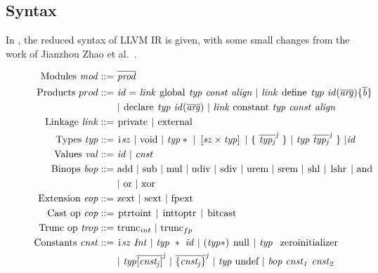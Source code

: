 \subsection{Syntax}
In , the reduced syntax of LLVM IR is given, with some small changes from the work of Jianzhou Zhao et al.~\cite{Zhao:2012:FLI:2103656.2103709}.\begin{figure}[!htb]
\begin{align*}
\begin{aligned}
\text{Modules }\mathit{mod} ::=\ &\overline{\mathit{prod}} \\
\text{Products }prod ::=\ & \mathit{id =\ }\mathit{link}\ \kw{global}\ \mathit{typ}\ \mathit{const}\ \mathit{align}\ |\ \mathit{link}\ \kw{define} \mathit{\ typ\ id(\overline{arg})\{\overline{b}\}}\\
&|\ \kw{declare} \mathit{\ typ\ id(\overline{arg})}\ |\ \mathit{link}\ \kw{constant}\ \mathit{typ}\ \mathit{const}\ \mathit{align}\\
\text{Linkage } \mathit{link} ::=\ &\kw{private}\ |\ \kw{external}\\
\text{Types } \mathit{typ} ::=\ &\kw{i} \mathit{sz\ |\ } \kw{void} \mathit{\ |\ typ*\ |\ \left[sz \times typ\right]\ |\ \lbrace\ \overline{typ_{j}}^{j}\ \rbrace\ |\ typ\ \overline{typ_{j}}^{j}\ \rbrace\ | id} \\
\text{Values } \mathit{val} ::=\ &\mathit{ id\ |\ cnst} \\
\text{Binops } \mathit{bop} ::=\ &\kw{add} \ |\ \kw{sub}\ |\ \kw{mul}\ |\ \kw{udiv}\ |\ \kw{sdiv}\ |\ \kw{urem}\ |\ \kw{srem}\ |\ \kw{shl}\ |\ \kw{lshr}\ |\ \kw{and}\\
&|\ \kw{or}\ |\ \kw{xor} \\
\text{Extension } \mathit{eop} ::=\ &\kw{zext} \ |\ \kw{sext} \ |\ \kw{fpext} \\
\text{Cast op } \mathit{cop} ::=\ &%
\kw{ptrtoint} \ |\ \kw{inttoptr} \ |\ \kw{bitcast} \\
\text{Trunc op } \mathit{trop} ::=\ &\kw{trunc}_{int} \ |\ \kw{trunc}_{fp} \\
\text{Constants } \mathit{cnst} ::=\ &\kw{i}\mathit{sz\ Int\ |\ }
\mathit{typ\ *\ id\ |\ (typ*)\ } \kw{null}\mathit{\ |\ typ\ } \kw{zeroinitializer} \\
&\mathit{|\ typ\overline{[cnst_{j}]}^{j}\ |\ \overline{\lbrace cnst_{j} \rbrace}^{j}\ |\ typ\ }\kw{undef}\mathit{\ |\ bop\ cnst_{1}\ cnst_{2}} \\

\end{aligned}
\end{align*}
\end{figure}
